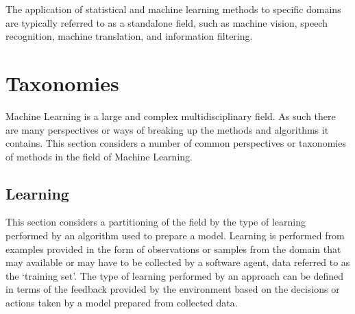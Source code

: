 The application of statistical and machine learning methods to specific domains are typically referred to as a standalone field, such as machine vision, speech recognition, machine translation, and information filtering.

%
%
\section{Taxonomies}
\label{sec:taxonomies}
Machine Learning is a large and complex multidisciplinary field. As such there are many perspectives or ways of breaking up the methods and algorithms it contains. This section considers a number of common perspectives or taxonomies of methods in the field of Machine Learning.

\subsection{Learning}
\label{subsec:learning}
This section considers a partitioning of the field by the type of learning performed by an algorithm used to prepare a model. Learning is performed from examples provided in the form of observations or samples from the domain that may available or may have to be collected by a software agent, data referred to as the `training set'. The type of learning performed by an approach can be defined in terms of the feedback provided by the environment based on the decisions or actions taken by a model prepared from collected data.

